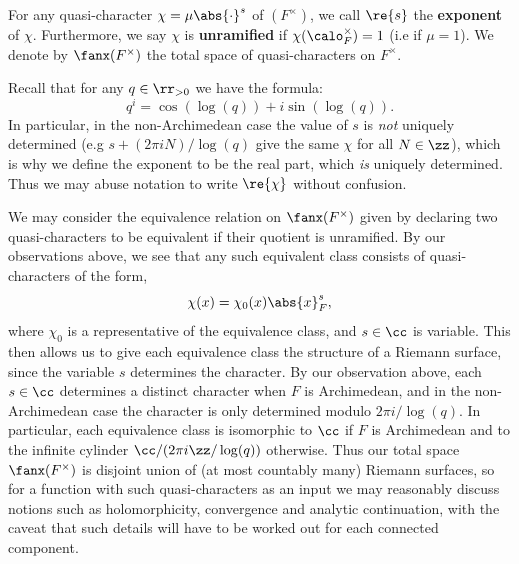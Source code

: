 \documentclass[11pt, x11names, openany]{book}
\begin{document}
\begin{defn}
\label{def: exponent and unramified character}
    For any quasi-character  $\chi = \mu \abs{\cdot}^s$ of  $(F^\times)$, we call $\re{s}$ the \textbf{exponent} of $\chi$. Furthermore, we say $\chi$ is \textbf{unramified} if $\chi(\calo_F^\times) = 1$ (i.e if $\mu = 1$). We denote by $\fanx(F^\times)$ the total space of quasi-characters on $F^\times$.
\end{defn}
\begin{warning}
    Recall that for any $q \in \rr_{> 0}$ we have the formula:
    \begin{equation*}
        q^i = \cos(\log(q)) + i \sin(\log(q)).
    \end{equation*}
    In particular, in the non-Archimedean case the value of $s$ is \textit{not} uniquely determined (e.g $s + (2 \pi i N)/\log(q)$ give the same $\chi$ for all $N \in \zz$), which is why we define the exponent to be the real part, which \textit{is} uniquely determined. Thus we may abuse notation to write $\re{\chi}$ without confusion.
\end{warning}

We may consider the equivalence relation on $\fanx(F^\times)$ given by declaring two quasi-characters to be equivalent if their quotient is unramified. By our observations above, we see that any such equivalent class consists of quasi-characters of the form,
\begin{equation*}
    \chi(x) = \chi_0(x) \abs{x}_F^s,
\end{equation*}
where $\chi_0$ is a representative of the equivalence class, and $s \in \cc$ is variable. This then allows us to give each equivalence class the structure of a Riemann surface, since the variable $s$ determines the character. By our observation above, each $s \in \cc$ determines a distinct character when $F$ is Archimedean, and in the non-Archimedean case the character is only determined modulo $2 \pi i/\log(q)$. In particular, each equivalence class is isomorphic to $\cc$ if $F$ is Archimedean and to the infinite cylinder $\cc/(2 \pi i \zz/\log(q))$ otherwise. Thus our total space $\fanx(F^\times)$ is disjoint union of (at most countably many) Riemann surfaces, so for a function with such quasi-characters as an input we may reasonably discuss notions such as holomorphicity, convergence and analytic continuation, with the caveat that such details will have to be worked out for each connected component. 
\end{document}
